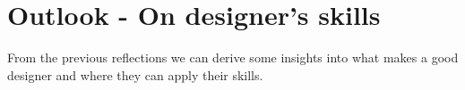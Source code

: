 \documentclass{article}
\begin{document}
\begin{comment}
\section{Research in design}
\label{sec:DR}
{\color{red}
REmco van der Lugt - Sketching
Tom Howard - use of stimuli
Chris Snider - 2 different ways of doing detailed design}
\end{comment}

\section{Outlook - On designer's skills}
\label{sec:skills}
From the previous reflections we can derive some insights into what makes a good designer and where they can apply their skills.
\end{document}

